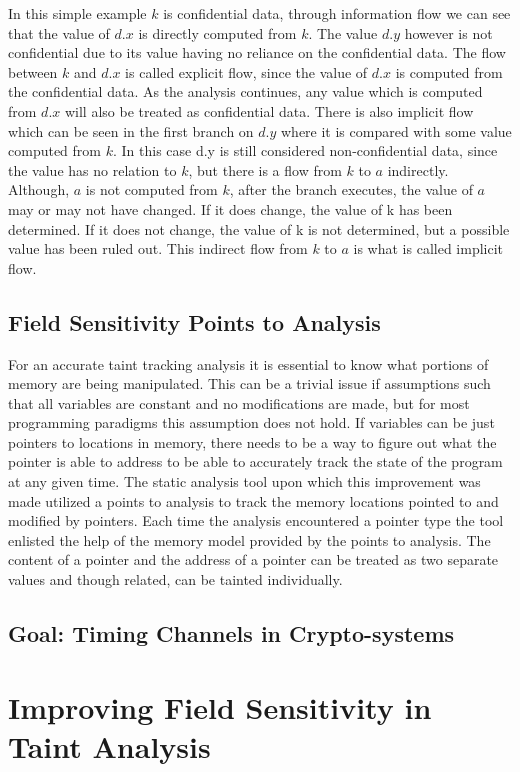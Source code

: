 \documentclass[11pt,a4paper]{article}
\begin{document}
  In this simple example $k$ is confidential data, through information flow we
  can see that the value of $d.x$ is directly computed from $k$. The value $d.y$
  however is not confidential due to its value having no reliance on the
  confidential data. The flow between $k$ and $d.x$ is called explicit flow,
  since the value of $d.x$ is computed from the confidential data. As the
  analysis continues, any value which is computed from $d.x$ will also be
  treated as confidential data. There is also implicit flow which can be seen in
  the first branch on $d.y$ where it is compared with some value computed from
  $k$. In this case d.y is still considered non-confidential data, since the
  value has no relation to $k$, but there is a flow from $k$ to $a$ indirectly.
  Although, $a$ is not computed from $k$, after the branch executes, the value
  of $a$ may or may not have changed. If it does change, the value of k has been
  determined. If it does not change, the value of k is not determined, but a
  possible value has been ruled out. This indirect flow from $k$ to $a$ is what
  is called implicit flow.
\subsection{Field Sensitivity Points to Analysis}
  For an accurate taint tracking analysis it is essential to know what portions of
  memory are being manipulated. This can be a trivial issue if assumptions such
  that all variables are constant and no modifications are made, but for most
  programming paradigms this assumption does not hold. If variables can be just
  pointers to locations in memory, there needs to be a way to figure out what the
  pointer is able to address to be able to accurately track the state of the
  program at any given time. The static analysis tool upon which this improvement
  was made utilized a points to analysis to track the memory locations pointed to
  and modified by pointers. Each time the analysis encountered a pointer type the
  tool enlisted the help of the memory model provided by the points to analysis.
  The content of a pointer and the address of a pointer can be treated as two
  separate values and though related, can be tainted individually. 
\subsection{Goal: Timing Channels in Crypto-systems}

\section{Improving Field Sensitivity in Taint Analysis}
\end{document}
